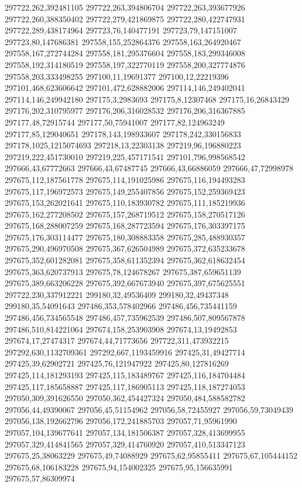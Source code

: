 297722,262,392481105
297722,263,394806704
297722,263,393677926
297722,260,388350402
297722,279,421869875
297722,280,422747931
297722,289,438174964
297723,76,140477191
297723,79,147151007
297723,80,147686381
297558,155,252864376
297558,163,264920467
297558,167,272744284
297558,181,295376604
297558,183,299346008
297558,192,314180519
297558,197,322770119
297558,200,327774876
297558,203,333498255
297100,11,19691377
297100,12,22219396
297101,468,623606642
297101,472,628882006
297114,146,249402041
297114,146,249942180
297175,3,2983693
297175,8,12307468
297175,16,26843429
297176,202,310795977
297176,206,316028532
297176,206,316367885
297177,48,72915744
297177,50,75941007
297177,82,124963249
297177,85,129040651
297178,143,198933607
297178,242,330156833
297178,1025,1215074693
297218,13,22303138
297219,96,196880223
297219,222,451730010
297219,225,457171541
297101,796,998568542
297666,43,67772663
297666,43,67487745
297666,43,66886059
297666,47,72998978
297675,112,187561778
297675,114,191025986
297675,116,194493283
297675,117,196972573
297675,149,255407856
297675,152,259369423
297675,153,262021641
297675,110,183930782
297675,111,185219936
297675,162,277208502
297675,157,268719512
297675,158,270517126
297675,168,288007259
297675,168,287723594
297675,176,303397175
297675,176,303114477
297675,180,308883358
297675,285,488930357
297675,290,496970508
297675,367,626504989
297675,372,635233678
297675,352,601282081
297675,358,611352394
297675,362,618632454
297675,363,620737913
297675,78,124678267
297675,387,659651139
297675,389,663206228
297675,392,667673940
297675,397,675625551
297722,230,337912221
299180,32,49536409
299180,32,49437348
299180,35,54091643
297486,353,578402966
297486,456,735441159
297486,456,734565548
297486,457,735962539
297486,507,809567878
297486,510,814221064
297674,158,253903908
297674,13,19492853
297674,17,27474317
297674,44,71773656
297722,311,473932215
297292,630,1132709361
297292,667,1193459916
297425,31,49427714
297425,39,62902721
297425,76,121947922
297425,80,127816269
297425,114,181293193
297425,115,183489767
297425,116,184704484
297425,117,185658887
297425,117,186905113
297425,118,187274053
297050,309,391626550
297050,362,454427324
297050,484,588582782
297056,44,49390067
297056,45,51154962
297056,58,72455927
297056,59,73049439
297056,138,192662796
297056,172,241885703
297057,71,95961990
297057,104,139677641
297057,134,181506387
297057,328,413699955
297057,329,414841565
297057,329,414760920
297057,410,513347123
297675,25,38063229
297675,49,74088929
297675,62,95855411
297675,67,105444152
297675,68,106183228
297675,94,154002325
297675,95,156635991
297675,57,86309974
